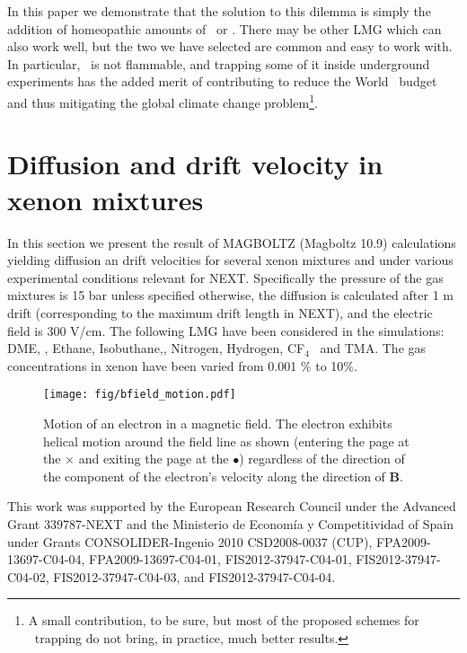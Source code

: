 \documentclass{JINST}
\begin{document}
In this paper we demonstrate that the solution to this dilemma is simply the addition of homeopathic amounts of \CHF\ or \COT. There may be other LMG which can also work well, but the two we have selected are common and easy to work with. In particular, \COT\ is not flammable, and trapping some of it inside underground experiments has the added merit of contributing to reduce the World \COT\ budget and thus mitigating the global climate change problem\footnote{A small contribution, to be sure, but most of the proposed schemes for \COT\ trapping do not bring, in practice, much better results.}.
 
\section{Diffusion and drift velocity in xenon mixtures}
\label{sec.intro}

In this section we present the result of MAGBOLTZ (Magboltz 10.9) calculations yielding diffusion an drift velocities for several xenon mixtures and under various experimental conditions relevant for NEXT. Specifically the pressure of the gas mixtures is 15 bar unless specified otherwise, the diffusion is calculated after 1 m drift (corresponding to the maximum drift length in NEXT), and the electric field is 300 V/cm. The following LMG have been considered in the simulations: DME, \CHF, Ethane, Isobuthane,\COT, Nitrogen, Hydrogen, CF$_4$~ and TMA. The gas concentrations in xenon have been varied from 0.001 \% to 10\%. 

\begin{figure}[!htb]
	\centering
	\texttt{[image: fig/bfield\_motion.pdf]}
	\caption{\label{fig_bfieldmotion}Motion of an electron in a magnetic field.  The electron exhibits helical motion around the field line as shown (entering the page at the $\times$ and exiting the page at the $\bullet$) regardless of the direction of the component of the electron's velocity along the direction of $\mathbf{B}$.}
\end{figure}


\acknowledgments

This work was supported by the European Research Council under the Advanced Grant 339787-NEXT and the Ministerio de Econom\'{i}a y Competitividad of Spain under Grants CONSOLIDER-Ingenio 2010 CSD2008-0037 (CUP), FPA2009-13697-C04-04, FPA2009-13697-C04-01, FIS2012-37947-C04-01, FIS2012-37947-C04-02, FIS2012-37947-C04-03, and FIS2012-37947-C04-04.


\end{document}
